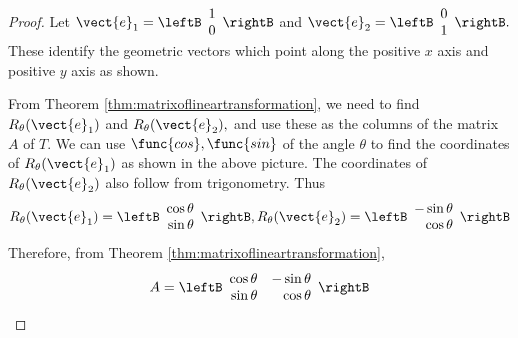 \begin{proof}
Let $\vect{e}_{1} = \leftB
\begin{array}{r}
1 \\
0
\end{array}
\rightB $ and $\vect{e}_{2} = \leftB
\begin{array}{r}
0 \\
1
\end{array}
\rightB .$ These identify the geometric vectors which point along the
positive $x$ axis and positive $y$ axis as shown.

\begin{center}
\end{center}
 
From Theorem \ref{thm:matrixoflineartransformation}, we need to find $R_{\theta}(\vect{e}_{1})$ and $R_{\theta}(\vect{e}_{2}), $
and use these as the columns of the matrix $A$ of $T$. We can use  
$\func{cos},\func{sin}$ of the angle $\theta$ to find the coordinates of $R_{\theta}(\vect{e}_{1})$ as shown
in the above picture. The coordinates of $R_{\theta}(\vect{e}_{2})$ also follow from
trigonometry. Thus
\begin{equation*}
R_{\theta}(\vect{e}_{1})=\leftB
\begin{array}{r}
\cos \theta \\
\sin \theta
\end{array}
\rightB ,R_{\theta}(\vect{e}_{2})=\leftB
\begin{array}{r}
-\sin \theta \\
\cos \theta
\end{array}
\rightB 
\end{equation*}
Therefore, from Theorem \ref{thm:matrixoflineartransformation},
\begin{equation*}
A=\leftB
\begin{array}{rr}
\cos \theta & -\sin \theta \\
\sin \theta & \cos \theta
\end{array}
\rightB
\end{equation*}


\end{proof}
